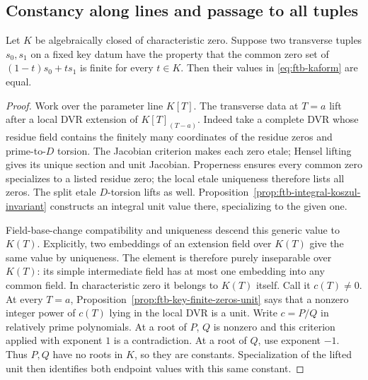 \subsection{Constancy along lines and passage to all tuples}
\begin{srlemma}\label{lem:ftb-key-line}
Let \(K\) be algebraically closed of characteristic zero.
Suppose two transverse tuples \(s_0,s_1\) on a fixed key datum have
the property that the common zero set of
\((1-t)s_0+ts_1\) is finite for every \(t\in K\).
Then their values in \eqref{eq:ftb-kaform} are equal.
\end{srlemma}
\begin{proof}
Work over the parameter line \(K[T]\).
The transverse data at \(T=a\) lift after a local DVR extension of
\(K[T]_{(T-a)}\).  Indeed take a complete DVR whose residue field
contains the finitely many coordinates of the residue zeros and
prime-to-\(D\) torsion.  The Jacobian criterion makes each zero
etale; Hensel lifting gives its unique section and unit Jacobian.
Properness ensures every common zero specializes to a listed
residue zero; the local etale uniqueness therefore lists all zeros.
The split etale \(D\)-torsion lifts as well.
Proposition~\ref{prop:ftb-integral-koszul-invariant} constructs an
integral unit value there, specializing to the given one.

Field-base-change compatibility and uniqueness descend this generic
value to \(K(T)\).  Explicitly, two embeddings of an extension field
over \(K(T)\) give the same value by uniqueness.  The element is
therefore purely inseparable over \(K(T)\): its simple intermediate
field has at most one embedding into any common field.
In characteristic zero it belongs to \(K(T)\) itself.
Call it \(c(T)\ne0\).
At every \(T=a\), Proposition~\ref{prop:ftb-key-finite-zeros-unit}
says that a nonzero integer power of \(c(T)\) lying in the local
DVR is a unit.  Write \(c=P/Q\) in relatively prime polynomials.
At a root of \(P\), \(Q\) is nonzero and this criterion applied with
exponent \(1\) is a contradiction.  At a root of \(Q\), use
exponent \(-1\).
Thus \(P,Q\) have no roots in \(K\), so they are constants.
Specialization of the lifted unit then identifies both endpoint
values with this same constant.
\end{proof}

